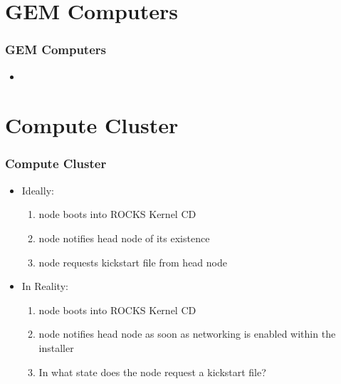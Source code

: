 \documentclass[aspectratio=169]{beamer}
\begin{document}


\section{GEM Computers}

\begin{frame}

  \frametitle{GEM Computers}

  \begin{itemize}
    \item 
  \end{itemize}

\end{frame}



\section{Compute Cluster}

\begin{frame}

  \frametitle{Compute Cluster}

  \begin{multicols}{2}
    
    \begin{itemize}
      
    \item Ideally:
      \begin{enumerate}
      \item node boots into ROCKS Kernel CD
      \item node notifies head node of its existence
      \item node requests kickstart file from head node
      \end{enumerate}
      
      \columnbreak
      
    \item In Reality:
      \begin{enumerate}
      \item node boots into ROCKS Kernel CD
      \item node notifies head node as soon as networking is enabled within
        the installer
      \item In what state does the node request a kickstart file?
      \end{enumerate}
      
    \end{itemize}
    
  \end{multicols}


\end{frame}
\end{document}
